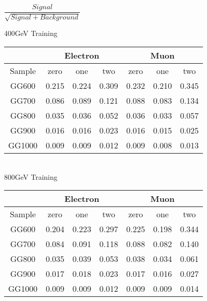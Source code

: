 \begin{frame}{$\dfrac{Signal}{\sqrt{Signal + Background}}$}
  
\begin{center}
400GeV Training
  \begin{tabular}{ | c | c | c | c | c | c | c |}
    \hline
    & \multicolumn{3}{|c|}{Electron} & \multicolumn{3}{|c|}{Muon}\\ \hline
    Sample  & zero& one  & two  & zero & one  & two  \\ \hline \hline
GG600 & 0.215 & 0.224 & 0.309 & 0.232 & 0.210 & 0.345\\ \hline
GG700 & 0.086 & 0.089 & 0.121 & 0.088 & 0.083 & 0.134\\ \hline
GG800 & 0.035 & 0.036 & 0.052 & 0.036 & 0.033 & 0.057\\ \hline
GG900 & 0.016 & 0.016 & 0.023 & 0.016 & 0.015 & 0.025\\ \hline
GG1000 & 0.009 & 0.009 & 0.012 & 0.009 & 0.008 & 0.013\\ \hline

\end{tabular}
\\
800GeV Training
\begin{tabular}{ | c | c | c | c | c | c | c |}
    \hline
    & \multicolumn{3}{|c|}{Electron} & \multicolumn{3}{|c|}{Muon}\\ \hline
    Sample  & zero& one  & two  & zero & one  & two  \\ \hline \hline
GG600 & 0.204 & 0.223 & 0.297 & 0.225 & 0.198 & 0.344\\ \hline
GG700 & 0.084 & 0.091 & 0.118 & 0.088 & 0.082 & 0.140\\ \hline
GG800 & 0.035 & 0.039 & 0.053 & 0.038 & 0.034 & 0.061\\ \hline
GG900 & 0.017 & 0.018 & 0.023 & 0.017 & 0.016 & 0.027\\ \hline
GG1000 & 0.009 & 0.009 & 0.012 & 0.009 & 0.009 & 0.014\\ \hline
\end{tabular}\end{center}
\end{frame}

